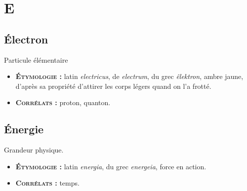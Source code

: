 \chapter{E}
\section{Électron}
Particule élémentaire
{\footnotesize
\begin{itemize}[leftmargin=1cm, label=, itemsep=1pt]
\item {\bf \textsc{Étymologie} :} latin {\it electricus}, de {\it electrum}, du grec {\it êlektron}, ambre jaune, d'après sa propriété d'attirer les corps légers quand on l'a frotté.
\item {\bf \textsc{Corrélats} :} proton, quanton.
\end{itemize}
}
\section{Énergie}
Grandeur physique.
{\footnotesize
\begin{itemize}[leftmargin=1cm, label=, itemsep=1pt]
\item {\bf \textsc{Étymologie} :} latin {\it energia}, du grec {\it energeia}, force en action.
\item {\bf \textsc{Corrélats} :} temps.
\end{itemize}
}
